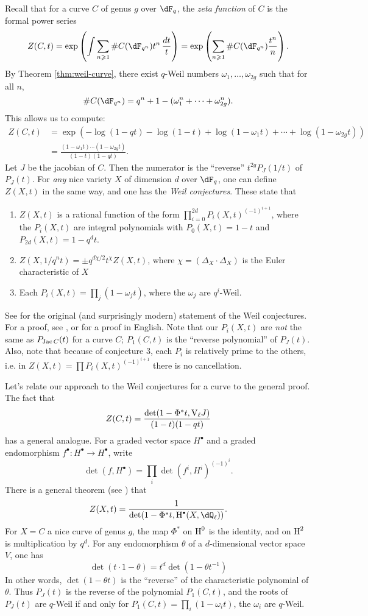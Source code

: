 Recall that for a curve $C$ of genus $g$ over $\dF_q$, the \emph{zeta function} 
of $C$ is the formal power series 
\[
  Z(C,t) = \exp\left(\int \sum_{n\geqslant 1} \# C(\dF_{q^n}) t^n\, \frac{dt}{t}\right)
    = \exp\left( \sum_{n\geqslant 1} \# C(\dF_{q^n}) \frac{t^n}{n}\right) \text{.}
\]
By Theorem \ref{thm:weil-curve}, there exist $q$-Weil numbers 
$\omega_1,\dots,\omega_{2 g}$ such that for all $n$, 
\[
  \# C(\dF_{q^n}) = q^n+1 - (\omega_1^n + \cdots + \omega_{2 g}^n) \text{.}
\]
This allows us to compute:
\begin{align*}
  Z(C,t) &= \exp(-\log(1-q t) - \log(1-t) + \log(1-\omega_1 t) + \cdots + \log(1-\omega_{2 g} t)) \\
    &= \frac{(1-\omega_1 t)\cdots (1-\omega_{2g} t)}{(1-t)(1-q t)} \text{.}
\end{align*}
Let $J$ be the jacobian of $C$. Then the numerator is the 
``reverse'' $t^{2g} P_J(1/t)$ of $P_J(t)$. For 
\emph{any} nice variety $X$ of dimension $d$ over $\dF_q$, one can define 
$Z(X,t)$ in the same way, and one has the \emph{Weil conjectures}. These state 
that 
\begin{enumerate}
  \item $Z(X,t)$ is a rational function of the form 
    $\prod_{i=0}^{2 d} P_i(X,t)^{(-1)^{i+1}}$, where the $P_i(X,t)$ are 
    integral polynomials with $P_0(X,t)=1-t$ and $P_{2 d}(X,t) = 1-q^d t$. 
  \item $Z(X,1/q^n t) = \pm q^{d\chi/2} t^\chi Z(X,t)$, where 
    $\chi=(\Delta_X\cdot \Delta_X)$ is the Euler characteristic of $X$
  \item Each $P_i(X,t) = \prod_j (1 - \omega_j t)$, where the $\omega_j$  are 
    $q^i$-Weil. 
\end{enumerate}
See \cite{we49} for the original (and surprisingly modern) statement of the 
Weil conjectures. For a proof, see \cite{de74}, or \cite{mi-ec} for a proof in 
English. Note that our $P_i(X,t)$ are \emph{not} the same as 
$P_{\operatorname{Jac} C}(t)$ for a curve $C$; $P_1(C,t)$ is the ``reverse polynomial'' of 
$P_J(t)$. Also, note that because of conjecture 3, each 
$P_i$ is relatively prime to the others, i.e. in 
$Z(X,t) = \prod P_i(X,t)^{(-1)^{i+1}}$ there is no cancellation. 

Let's relate our approach to the Weil conjectures for a curve to the general 
proof. The fact that 
\[
  Z(C,t) = \frac{\det(1-\Phi^\ast t,\mathrm{V}_\ell J)}{(1-t)(1-q t)}
\]
has a general analogue. For a graded vector space $H^\bullet$ and a graded 
endomorphism $f^\bullet:H^\bullet \to H^\bullet$, write 
\[
  \det(f,H^\bullet) = \prod_i \det(f^i, H^i)^{(-1)^i} \text{.}
\]
There is a general theorem (see \cite[1.5.4]{de74}) that
\[
  Z(X,t) = \frac{1}{\det(1-\Phi^\ast t,\h^\bullet(X,\dQ_\ell))} \text{.}
\]
For $X=C$ a nice curve of genus $g$, the map $\Phi^\ast$ on $\operatorname{H}^0$ is 
the identity, and on $\operatorname{H}^2$ is multiplication by $q^d$. For any endomorphism 
$\theta$ of a $d$-dimensional vector space $V$, one has 
\[
  \det(t\cdot 1-\theta) = t^d \det(1-\theta t^{-1})
\]
In other words, $\det(1-\theta t)$ is the ``reverse'' of the characteristic 
polynomial of $\theta$. Thus $P_J(t)$ is the reverse of the polynomial 
$P_1(C,t)$, and the roots of $P_J(t)$ are 
$q$-Weil if and only for $P_1(C,t) = \prod_i (1-\omega_i t)$, the 
$\omega_i$ are $q$-Weil. 

